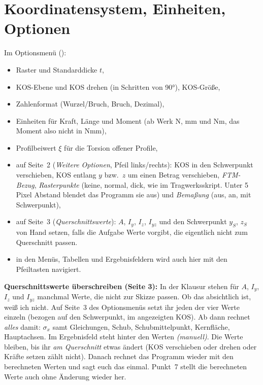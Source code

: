 \section{Koordinatensystem, Einheiten, Optionen}\label{sec:qs-kos}

Im Optionsmenü ():

\begin{itemize}
  \item Raster und Standarddicke $t$,
  \item KOS-Ebene und KOS drehen (in Schritten von 90°), KOS-Größe,
  \item Zahlenformat (Wurzel/Bruch, Bruch, Dezimal),
  \item Einheiten für Kraft, Länge und Moment (ab Werk N, mm und Nm, das Moment also nicht in
        Nmm),
  \item Profilbeiwert $\xi$ für die Torsion offener Profile,
  \item auf Seite~2 (\emph{Weitere Optionen}, Pfeil links/rechts): KOS in den Schwerpunkt
        verschieben, KOS entlang $y$ bzw.\ $z$ um einen Betrag verschieben, \emph{FTM-Bezug},
        \emph{Rasterpunkte} (keine, normal, dick, wie im Tragwerksskript. Unter 5 Pixel Abstand
        blendet das Programm sie aus) und \emph{Bemaßung} (aus, an, mit Schwerpunkt),
  \item auf Seite~3 (\emph{Querschnittswerte}): $A$, $I_y$, $I_z$, $I_{yz}$ und den Schwerpunkt
  $y_S$, $z_S$ von Hand setzen, falls die Aufgabe Werte vorgibt, die eigentlich nicht zum
  Querschnitt passen.
  \item in den Menüs, Tabellen und Ergebnisfeldern wird auch hier mit den Pfeiltasten navigiert.
\end{itemize}

\textbf{Querschnittswerte überschreiben (Seite 3):} In der Klausur stehen für $A$, $I_y$, $I_z$
und $I_{yz}$ manchmal Werte, die nicht zur Skizze passen. Ob das absichtlich ist, weiß ich nicht.
Auf Seite~3 des Optionsmenüs setzt ihr jeden der vier Werte einzeln (bezogen auf den
Schwerpunkt, im angezeigten KOS). Ab dann rechnet \emph{alles} damit: $\sigma_x$ samt Gleichungen,
Schub, Schubmittelpunkt, Kernfläche, Hauptachsen. Im Ergebnisfeld steht hinter den Werten
\emph{(manuell)}. Die Werte bleiben, bis ihr \emph{am Querschnitt} etwas ändert (KOS verschieben
oder drehen oder Kräfte setzen zählt nicht). Danach rechnet das Programm wieder mit den berechneten
Werten und sagt euch das einmal. Punkt~7 stellt die berechneten Werte auch ohne Änderung wieder her.

